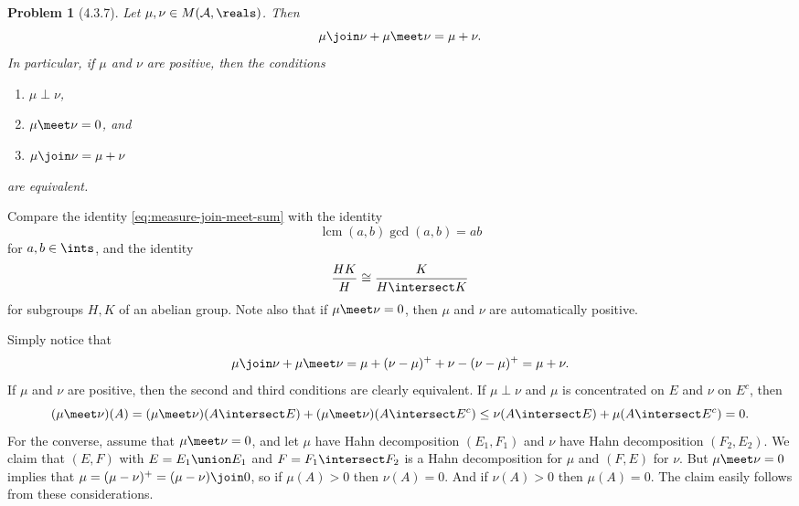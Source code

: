 \documentclass[a4paper, 11pt]{memoir}
\theoremstyle{plaincustomnumber}
\newtheorem{problem}{Problem}
\theoremstyle{changedotbreakcustomnumber}
\newcommand{\calA}{\mathcal{A}}
\begin{document}
\begin{problem}[4.3.7]
    Let $\mu, \nu \in M(\calA,\reals)$. Then
    \begin{equation}
        \label{eq:measure-join-meet-sum}
        \mu \join \nu + \mu \meet \nu
            = \mu + \nu.
    \end{equation}
    In particular, if $\mu$ and $\nu$ are positive, then the conditions
    \begin{enumerate}
        \item $\mu \perp \nu$,
        \item $\mu \meet \nu = 0$, and
        \item $\mu \join \nu = \mu + \nu$
    \end{enumerate}
    are equivalent.
\end{problem}
%
Compare the identity \cref{eq:measure-join-meet-sum} with the identity
%
\newcommand{\lcm}{\operatorname{lcm}}
\begin{equation*}
    \lcm(a,b) \gcd(a,b)
        = ab
\end{equation*}
%
for $a,b \in \ints$, and the identity
%
\begin{equation*}
    \frac{HK}{H}
        \cong \frac{K}{H \intersect K}
\end{equation*}
%
for subgroups $H,K$ of an abelian group. Note also that if $\mu \meet \nu = 0$, then $\mu$ and $\nu$ are automatically positive.

\begin{solution}
    Simply notice that
    \begin{equation*}
        \mu \join \nu + \mu \meet \nu
            = \mu + (\nu - \mu)^+ + \nu - (\nu - \mu)^+
            = \mu + \nu.
    \end{equation*}
    If $\mu$ and $\nu$ are positive, then the second and third conditions are clearly equivalent. If $\mu \perp \nu$ and $\mu$ is concentrated on $E$ and $\nu$ on $E^c$, then
    \begin{equation*}
        (\mu \meet \nu)(A)
            = (\mu \meet \nu)(A \intersect E) + (\mu \meet \nu)(A \intersect E^c)
            \leq \nu(A \intersect E) + \mu(A \intersect E^c)
            = 0.
    \end{equation*}
    For the converse, assume that $\mu \meet \nu = 0$, and let $\mu$ have Hahn decomposition $(E_1,F_1)$ and $\nu$ have Hahn decomposition $(F_2,E_2)$. We claim that $(E,F)$ with $E = E_1 \union E_1$ and $F = F_1 \intersect F_2$ is a Hahn decomposition for $\mu$ and $(F,E)$ for $\nu$. But $\mu \meet \nu = 0$ implies that $\mu = (\mu - \nu)^+ = (\mu - \nu) \join 0$, so if $\mu(A) > 0$ then $\nu(A) = 0$. And if $\nu(A) > 0$ then $\mu(A) = 0$. The claim easily follows from these considerations.
\end{solution}





\nocite{*}
\chapter*{\bibname}
\markboth{\bibname}{\bibname}
\printbibliography[heading=none]
\end{document}

